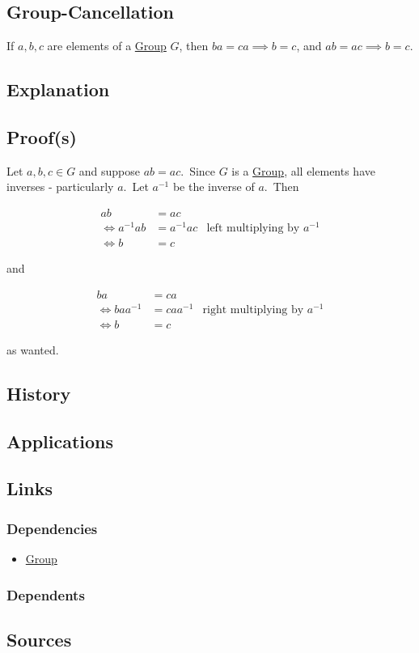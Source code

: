 \subsection{Group-Cancellation}\label{articles:algebra:group-theory:group-cancellation}
If $a, b, c$ are elements of a \hyperref[articles:algebra:group-theory:group]{Group} $G$, then $ba = ca \implies b = c$, and $ab = ac \implies b = c$.

\subsection{Explanation}

\subsection{Proof(s)}
Let $a, b, c \in G$ and suppose $ab = ac$.\
Since $G$ is a \hyperref[articles:algebra:group-theory:group]{Group}, all elements have inverses - particularly $a$.\
Let $a^{-1}$ be the inverse of $a$.\
Then

$$\begin{align*}
ab &= ac\\
\iff a^{-1} a b &= a^{-1} a c & \text{left multiplying by $a^{-1}$}\\
\iff b &= c
\end{align*}$$

and

$$\begin{align*}
ba &= ca\\
\iff baa^{-1} &= caa^{-1} & \text{right multiplying by $a^{-1}$}\\
\iff b &= c
\end{align*}$$

as wanted.

\subsection{History}

\subsection{Applications}

\subsection{Links}
\subsubsection{Dependencies}
\begin{itemize}
\item \hyperref[articles:algebra:group-theory:group]{Group}
\end{itemize}
\subsubsection{Dependents}

\subsection{Sources}

